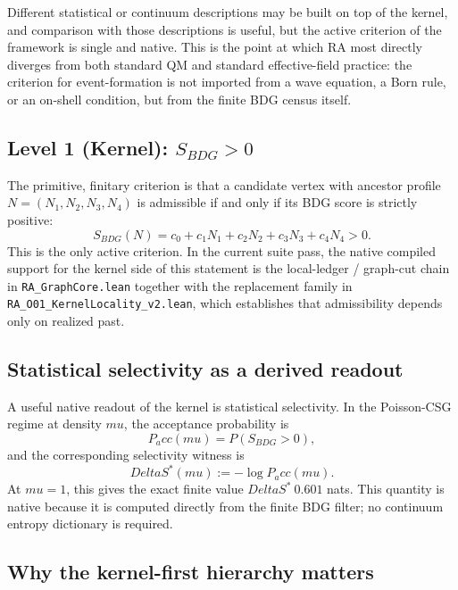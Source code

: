 \documentclass[11pt]{article}
\def\Delta{Delta}%
\def\mu{mu}%
\def\mathrm#1{#1}%
\def\mathbf#1{#1}%
\def\mathbb#1{#1}%
\def\approx{~}%
\def\Pacc{P_acc}%
\newcommand{\Pacc}{P_{\mathrm{acc}}}
\begin{document}
Different statistical or continuum descriptions may be built on top of the kernel, and comparison with those descriptions is useful, but the active criterion of the framework is single and native. This is the point at which RA most directly diverges from both standard QM and standard effective-field practice: the criterion for event-formation is not imported from a wave equation, a Born rule, or an on-shell condition, but from the finite BDG census itself.

\subsection{Level 1 (Kernel): $S_{\mathrm{BDG}} > 0$}

The primitive, finitary criterion is that a candidate vertex with ancestor profile $\mathbf{N}=(N_1,N_2,N_3,N_4)$ is admissible if and only if its BDG score is strictly positive:
\begin{equation}
\label{eq:level1}
S_{\mathrm{BDG}}(\mathbf{N}) = c_0 + c_1 N_1 + c_2 N_2 + c_3 N_3 + c_4 N_4 > 0.
\end{equation}
This is the only active criterion. In the current suite pass, the native compiled support for the kernel side of this statement is the local-ledger / graph-cut chain in \texttt{RA\_GraphCore.lean} together with the replacement family in \texttt{RA\_O01\_KernelLocality\_v2.lean}, which establishes that admissibility depends only on realized past.

\subsection{Statistical selectivity as a derived readout}

A useful native readout of the kernel is statistical selectivity. In the Poisson-CSG regime at density $\mu$, the acceptance probability is
\[
\Pacc(\mu)=\mathbb{P}(S_{\mathrm{BDG}}>0),
\]
and the corresponding selectivity witness is
\[
\Delta S^*(\mu):=-\log \Pacc(\mu).
\]
At $\mu=1$, this gives the exact finite value $\Delta S^*\approx 0.601$ nats. This quantity is native because it is computed directly from the finite BDG filter; no continuum entropy dictionary is required.

\subsection{Why the kernel-first hierarchy matters}
\end{document}
